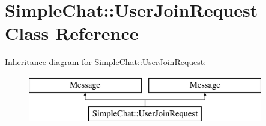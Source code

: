 \hypertarget{classSimpleChat_1_1UserJoinRequest}{\section{Simple\-Chat\-:\-:User\-Join\-Request Class Reference}
\label{classSimpleChat_1_1UserJoinRequest}
}
Inheritance diagram for Simple\-Chat\-:\-:User\-Join\-Request\-:\begin{figure}[H]
\begin{center}
\leavevmode
\includegraphics[height=2.000000cm]{classSimpleChat_1_1UserJoinRequest}
\end{center}
\end{figure}
